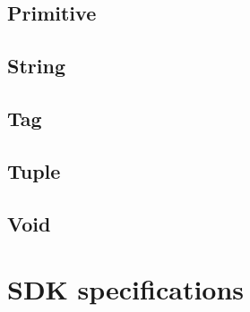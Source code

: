 \documentclass[openright,twoside,12pt]{report}
\begin{document}
\section{Primitive}
\section{String}
\section{Tag}
\section{Tuple}
\section{Void}
\label{sect:std-void}

\chapter{\urbi SDK specifications}

\end{document}
